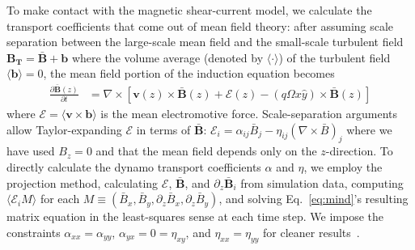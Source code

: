 \documentclass{epsconf}
\newcommand{\bb}[1]{\textbf{#1}}
\begin{document}
To make contact with the magnetic shear-current model, we calculate the transport coefficients that come out of mean field theory: after assuming scale separation between the large-scale mean field and the small-scale turbulent field $\mathbf{B_T}=\bar{\bb{B}}+\bb{b}$ where the volume average (denoted by $\langle\cdot\rangle$) of the turbulent field $\langle\bb{b}\rangle=0$, the mean field portion of the induction equation becomes
\begin{align}
    \frac{\partial\bar{\bb{B}}(z)}{\partial t}&=\nabla\times\left[\bb{v}(z)\times\bar{\bb{B}}(z)+\mathcal{E}(z)-(q\Omega x\hat y)\times\bar{\bb{B}}(z)\right] \label{eq:mind}
\end{align}
where $\mathcal{E}=\langle \bb{v}\times\bb{b}\rangle$ is the mean electromotive force. Scale-separation arguments allow Taylor-expanding $\mathcal{E}$ in terms of $\bar{\bb{B}}$: $\mathcal{E}_i = \alpha_{ij}\bar{B}_j - \eta_{ij}(\nabla\times\bar{B})_j$ where we have used $B_z = 0$ and that the mean field depends only on the $z$-direction. To directly calculate the dynamo transport coefficients $\alpha$ and $\eta$, we employ the projection method, calculating $\mathcal{E}$, $\bar{\bb{B}}$, and $\partial_z\bar{\bb{B}}_i$ from simulation data, computing $\langle\mathcal{E}_iM\rangle$ for each $M\equiv(\bar B_x, \bar B_y, \partial_z\bar B_x, \partial_z\bar B_y)$, and solving Eq.~\ref{eq:mind}'s resulting matrix equation in the least-squares sense at each time step. We impose the constraints $\alpha_{xx}=\alpha_{yy}$, $\alpha_{yx}=0=\eta_{xy}$, and $\eta_{xx}=\eta_{yy}$ for cleaner results~\cite{SB16}. 
\end{document}
